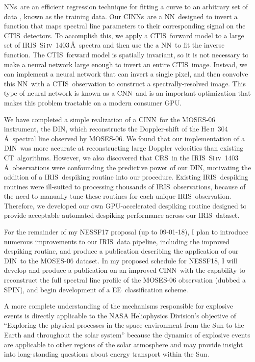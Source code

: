 \documentclass[10pt,letterpaper]{article}
\newcommand{\SiIV}{Si\,\textsc{iv}~1403\,\AA}
\newcommand{\HeII}{He\,\textsc{ii}~304\,\AA}
\newcommand{\EE}{\ac{EE}}
\newcommand{\CT}{\ac{CT}}
\newcommand{\CTIS}{\ac{CTIS}}
\newcommand{\MOSES}{\ac{MOSES}}
\newcommand{\NN}{\ac{NN}}
\newcommand{\NNs}{\acp{NN}}
\newcommand{\CNN}{\ac{CNN}}
\newcommand{\CINN}{\ac{CINN}}
\newcommand{\CINNs}{\acp{CINN}}
\newcommand{\DIN}{\ac{DIN}}
\newcommand{\SPIN}{\ac{SPIN}}
\newcommand{\IRIS}{\ac{IRIS}}
\newcommand{\CRS}{\ac{CRS}}
\newcommand{\GPU}{\ac{GPU}}
\begin{document}
		\NNs\ are an efficient regression technique for fitting a curve to an arbitrary set of data \citep{ai}, known as the training data.
		Our \CINNs\ are a \NN\ designed to invert a function that maps spectral line parameters to their corresponding signal on the \CTIS\ detectors.
		To accomplish this, we apply a \CTIS\ forward model to a large set of \IRIS\ \SiIV\ spectra and then use the a \NN\ to fit the inverse function.
		The \CTIS\ forward model is spatially invariant, so it is not necessary to make a neural network large enough to invert an entire \CTIS\ image.
		Instead, we can implement a neural network that can invert a single pixel, and then convolve this \NN\ with a \CTIS\ observation to construct a spectrally-resolved image.
		This type of neural network is known as a \CNN\ and is an important optimization that makes this problem tractable on a modern consumer \GPU.
			
		We have completed a simple realization of a \CINN\ for the \MOSES-06 instrument, the \DIN, which reconstructs the Doppler-shift of the \HeII\ spectral line observed by \MOSES-06.
		We found that our implementation of a \DIN\ was more accurate at reconstructing large Doppler velocities than existing \CT\ algorithms.
		However, we also discovered that \CRS\ in the \IRIS\ \SiIV\ observations were confounding the predictive power of our \DIN, motivating the addition of a \IRIS\ despiking routine into our procedure.
		Existing \IRIS\ despiking routines were ill-suited to processing thousands of \IRIS\ observations, because of the need to manually tune these routines for each unique \IRIS\ observation.
		Therefore, we developed our own GPU-accelerated despiking routine designed to provide acceptable automated despiking performance across our \IRIS\ dataset.
		
		For the remainder of my NESSF17 proposal (up to 09-01-18), I plan to introduce numerous improvements to our \IRIS\ data pipeline, including the improved despiking routine, and produce a publication describing the application of our \DIN\ to the \MOSES-06 dataset.
		In my proposed schedule for NESSF18, I will develop and produce a publication on an improved \CINN\ with the capability to reconstruct the full spectral line profile of the \MOSES-06 observation (dubbed a \SPIN), and begin development of a \EE\ classification scheme.
		
		A more complete understanding of the mechanisms responsible for explosive events is directly applicable to the NASA Heliophysics Division's objective of ``Exploring the physical processes in the space environment from the Sun to the Earth and throughout the solar system'' because the dynamics of explosive events are applicable to other regions of the solar atmosphere and may provide insight into long-standing questions about energy transport within the Sun.
		
\end{document}
